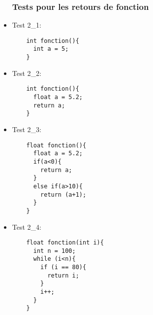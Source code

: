 \documentclass[a4paper,10pt]{report}
\begin{document}
\begin{itemize}
  \subsubsection{Tests pour les retours de fonction}

\item Test 2_1:
  \begin{Verbatim}
    int fonction(){
      int a = 5;
    }
  \end{Verbatim}

\item Test 2_2:
  \begin{Verbatim}
    int fonction(){
      float a = 5.2;
      return a;
    }
  \end{Verbatim}

\item Test 2_3:
  \begin{Verbatim}
    float fonction(){
      float a = 5.2;
      if(a<0){
        return a;
      }
      else if(a>10){
        return (a+1);
      }
    }
  \end{Verbatim}

\item Test 2_4:
  \begin{Verbatim}
    float fonction(int i){
      int n = 100;
      while (i<n){
        if (i == 80){
          return i;
        }      
        i++;
      }
    }
  \end{Verbatim}



\end{itemize}
\newpage
\end{document}
